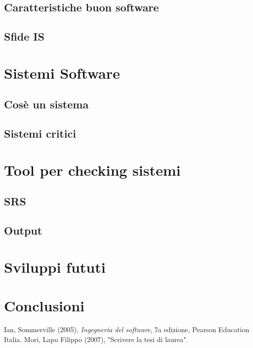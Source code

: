 \documentclass[a4paper,11pt]{book}
\begin{document}
		\section{Caratteristiche buon software}
		\section{Sfide IS}
	\chapter{Sistemi Software}
		\section{Cosè un sistema}
		\section{Sistemi critici}
	\chapter{Tool per checking sistemi}
		\section{SRS}
		\section{Output}
	\chapter{Sviluppi fututi} \label{ladnsdnasdasdksd}
	\chapter{Conclusioni} \label{ladnsdnasdasdksd}
	
	\begin{thebibliography}{9}
		Ian, Sommerville (2005),
		\emph{Ingegneria del software}, 7a edizione, Pearson Education Italia.
		Mori, Lapo Filippo (2007),
		"Scrivere la tesi di laurea".
	\end{thebibliography}
	
\end{document}
